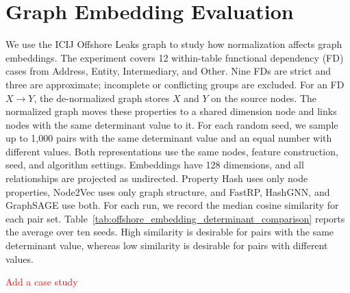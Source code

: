 \documentclass[sigconf]{acmart}
\begin{document}
\section{Graph Embedding Evaluation}
We use the ICIJ Offshore Leaks graph to study how normalization affects graph embeddings. The experiment covers 12 within-table functional dependency (FD) cases from Address, Entity, Intermediary, and Other. Nine FDs are strict and three are approximate; incomplete or conflicting groups are excluded. For an FD $X\rightarrow Y$, the de-normalized graph stores $X$ and $Y$ on the source nodes. The normalized graph moves these properties to a shared dimension node and links nodes with the same determinant value to it. For each random seed, we sample up to 1,000 pairs with the same determinant value and an equal number with different values. Both representations use the same nodes, feature construction, seed, and algorithm settings. Embeddings have 128 dimensions, and all relationships are projected as undirected. Property Hash uses only node properties, Node2Vec uses only graph structure, and FastRP, HashGNN, and GraphSAGE use both. For each run, we record the median cosine similarity for each pair set. Table~\ref{tab:offshore_embedding_determinant_comparison} reports the average over ten seeds. High similarity is desirable for pairs with the same determinant value, whereas low similarity is desirable for pairs with different values.

\textcolor{red}{Add a case study}
\end{document}
